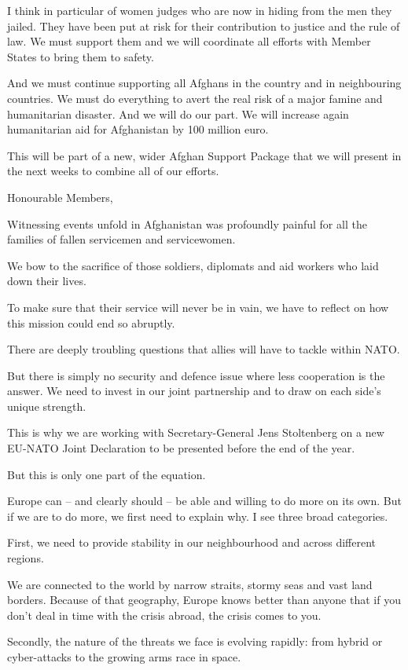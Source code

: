 \documentclass[a4paper,11pt]{article}
\begin{document}
I think in particular of women judges who are now in hiding from the men they jailed. They have been put at risk for their contribution to justice and the rule of law. We must support them and we will coordinate all efforts with Member States to bring them to safety.

And we must continue supporting all Afghans in the country and in neighbouring countries. We must do everything to avert the real risk of a major famine and humanitarian disaster. And we will do our part. We will increase again humanitarian aid for Afghanistan by 100 million euro.

This will be part of a new, wider Afghan Support Package that we will present in the next weeks to combine all of our efforts.

 

Honourable Members,

Witnessing events unfold in Afghanistan was profoundly painful for all the families of fallen servicemen and servicewomen.

We bow to the sacrifice of those soldiers, diplomats and aid workers who laid down their lives.

To make sure that their service will never be in vain, we have to reflect on how this mission could end so abruptly.

There are deeply troubling questions that allies will have to tackle within NATO.

But there is simply no security and defence issue where less cooperation is the answer. We need to invest in our joint partnership and to draw on each side's unique strength.

This is why we are working with Secretary-General Jens Stoltenberg on a new EU-NATO Joint Declaration to be presented before the end of the year.

But this is only one part of the equation.

Europe can – and clearly should – be able and willing to do more on its own. But if we are to do more, we first need to explain why. I see three broad categories.

First, we need to provide stability in our neighbourhood and across different regions.

We are connected to the world by narrow straits, stormy seas and vast land borders. Because of that geography, Europe knows better than anyone that if you don't deal in time with the crisis abroad, the crisis comes to you.

Secondly, the nature of the threats we face is evolving rapidly: from hybrid or cyber-attacks to the growing arms race in space.
\end{document}
